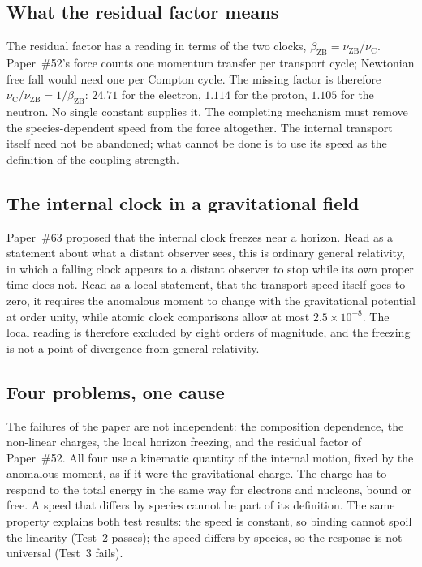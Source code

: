 \documentclass[%
 reprint, amsmath,amssymb, aps, prb, ]{revtex4-2}
\numberwithin{equation}{section}
\newcommand{\betaZB}{\beta_{\text{ZB}}}
\newcommand{\nuZB}{\nu_{\text{ZB}}}
\newcommand{\nuC}{\nu_{\text{C}}}
\begin{document}
\subsection{What the residual factor means}

The residual factor has a reading in terms of the two clocks, $\betaZB = \nuZB/\nuC$. Paper~\#52's force counts one momentum transfer per transport cycle; Newtonian free fall would need one per Compton cycle. The missing factor is therefore $\nuC/\nuZB = 1/\betaZB$: $24.71$ for the electron, $1.114$ for the proton, $1.105$ for the neutron. No single constant supplies it. The completing mechanism must remove the species-dependent speed from the force altogether. The internal transport itself need not be abandoned; what cannot be done is to use its speed as the definition of the coupling strength.

\subsection{The internal clock in a gravitational field}

Paper~\#63 proposed that the internal clock freezes near a horizon. Read as a statement about what a distant observer sees, this is ordinary general relativity, in which a falling clock appears to a distant observer to stop while its own proper time does not. Read as a local statement, that the transport speed itself goes to zero, it requires the anomalous moment to change with the gravitational potential at order unity, while atomic clock comparisons allow at most $2.5\times10^{-8}$. The local reading is therefore excluded by eight orders of magnitude, and the freezing is not a point of divergence from general relativity.

\subsection{Four problems, one cause}

The failures of the paper are not independent: the composition dependence, the non-linear charges, the local horizon freezing, and the residual factor of Paper~\#52. All four use a kinematic quantity of the internal motion, fixed by the anomalous moment, as if it were the gravitational charge. The charge has to respond to the total energy in the same way for electrons and nucleons, bound or free. A speed that differs by species cannot be part of its definition. The same property explains both test results: the speed is constant, so binding cannot spoil the linearity (Test~2 passes); the speed differs by species, so the response is not universal (Test~3 fails).
\end{document}
